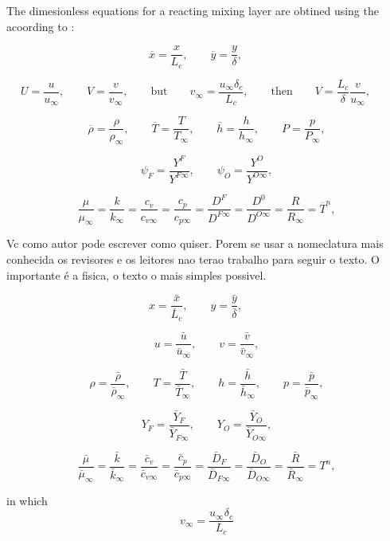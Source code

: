 The dimesionless equations for a reacting mixing layer
 are obtined using the acoording to \cite{planche1992numerical}:

\begin{equation}
\overline{x}=\frac{x}{L_c}, \qquad 
\overline{y}=\frac{y}{\delta}, \qquad 
\end{equation} 

\begin{equation}
U=\frac{u}{u_{\infty}}, \qquad 
V=\frac{v}{v_{\infty}},\qquad\text{but}\qquad
v_{\infty}=\frac{u_{\infty}\delta_c}{L_c},\qquad\text{then}\qquad
V=\frac{L_c}{\delta}\frac{v}{u_{\infty}},\qquad
\end{equation} 

\begin{equation}
\overline{\rho}=\frac{\rho}{\rho_{\infty}}, \qquad
\overline{T}=\frac{T}{T_{\infty}}, \qquad
\overline{h}=\frac{h}{h_{\infty}}, \qquad
P=\frac{p}{P_{\infty}}, 
\end{equation} 

\begin{equation}
\psi_F=\frac{Y^F}{Y^{F\infty}}, \qquad
\psi_O=\frac{Y^O}{Y^{O\infty}}, 
\end{equation} 

\begin{equation}
\frac{\mu}{\mu_{\infty}} =
\frac{k}{k_{\infty}} =
\frac{c_v}{c_{v\infty}} =
\frac{c_p}{c_{p\infty}} =
\frac{D^F}{D^{F\infty}}= 
\frac{D^0}{D^{O\infty}}= 
\frac{R}{R_\infty}= 
\overline{T}^n,
\end{equation} 

{\color{red}
Vc como autor pode escrever como quiser.
Porem se usar a nomeclatura mais conhecida os revisores e os leitores nao terao trabalho para seguir o texto. O importante  é a fisica, o texto o mais simples possivel.

\[
x=\frac{\bar{x}}{\bar{L}_c}, \qquad 
y=\frac{\bar{y}}{\bar{\delta}}, \qquad 
\]

\[
u=\frac{\bar{u}}{\bar{u}_{\infty}}, \qquad 
v=\frac{\bar{v}}{\bar{v}_{\infty}},
\]

\begin{equation}
\rho=\frac{\bar{\rho}}{\bar{\rho}_{\infty}}, \qquad
T=\frac{\bar{T}}{\bar{T}_{\infty}}, \qquad
h=\frac{\bar{h}}{\bar{h}_{\infty}}, \qquad
p=\frac{\bar{p}}{\bar{p} _{\infty}}, 
\end{equation} 

\begin{equation}
Y_F=\frac{\bar{Y}_F}{\bar{Y}_{F\infty}}, \qquad
Y_O=\frac{\bar{Y}_O}{\bar{Y}_{O\infty}}, 
\end{equation} 

\begin{equation}
\frac{\bar{\mu}} {\bar{\mu}_{\infty}} =
\frac{\bar{k}} {\bar{k}_{\infty}} =
\frac{\bar{c}_v} {\bar{c}_{v\infty}} =
\frac{\bar{c}_p} {\bar{c}_{p\infty}} =
\frac{ \bar{D}_F} {\bar{D}_{F\infty} }= 
\frac{ \bar{D}_O} { \bar{D}_{O\infty} }= 
\frac{\bar{R}}{\bar{R}_\infty}= 
T^n,
\end{equation} 

in which
\[
v_{\infty}=\frac{u_{\infty}\delta_c}{L_c}
\]

}

